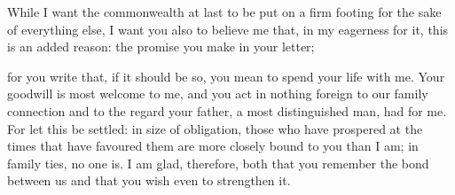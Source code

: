 

 While I want the commonwealth at last to be put on a firm footing for the sake of everything else, I want you also to believe me that, in my eagerness for it, this is an added reason: the promise you make in your letter;

 for you write that, if it should be so, you mean to spend your life with me. Your goodwill is most welcome to me, and you act in nothing foreign to our family connection and to the regard your father, a most distinguished man, had for me. For let this be settled: in size of obligation, those who have prospered at the times that have favoured them are more closely bound to you than I am; in family ties, no one is. I am glad, therefore, both that you remember the bond between us and that you wish even to strengthen it.
